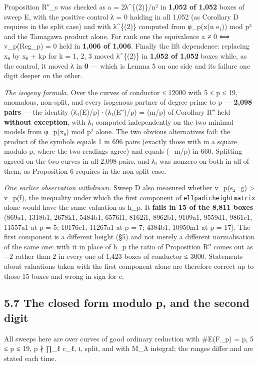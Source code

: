 \documentclass[11pt,a4paper]{article}
\theoremstyle{named}
\begin{document}
Proposition R″\_s was checked as a = 2λ\textasciicircum{}\{(2)\}/n² in \textbf{1,052 of 1,052} boxes of sweep E, with the positive control λ = 0 holding in all 1,052 (as Corollary D requires in the split case) and with λ\textasciicircum{}\{(2)\} computed from φ\_p(x(n e₁)) mod p³ and the Tamagawa product alone. For rank one the equivalence a ≠ 0 ⟺ v\_p(Reg\_p) = 0 held in \textbf{1,006 of 1,006}. Finally the lift dependence: replacing x₀ by x₀ + kp for k = 1, 2, 3 moved λ\textasciicircum{}\{(2)\} in \textbf{1,052 of 1,052} boxes while, as the control, it moved λ in \textbf{0} — which is Lemma 5 on one side and its failure one digit deeper on the other.

\textit{The isogeny formula.} Over the curves of conductor ≤ 12000 with 5 ≤ p ≤ 19, anomalous, non-split, and every isogenous partner of degree prime to p — \textbf{2,098 pairs} — the identity (λ₁(E)/p)·(λ₁(E″)/p) = (m/p) of Corollary R‴ held \textbf{without exception}, with λ₁ computed independently on the two minimal models from φ\_p(x₀) mod p² alone. The two obvious alternatives fail: the product of the symbols equals 1 in 696 pairs (exactly those with m a square modulo p, where the two readings agree) and equals (−m/p) in 660. Splitting agreed on the two curves in all 2,098 pairs, and λ₁ was nonzero on both in all of them, as Proposition 6 requires in the non-split case.

\textit{One earlier observation withdrawn.} Sweep D also measured whether v\_p(s₂·g) \textgreater{} v\_p(f), the inequality under which the first component of \texttt{ellpadicheightmatrix} alone would have the same valuation as h\_p. It \textbf{fails in 15 of the 8,811 boxes} (869a1, 1318b1, 2678k1, 5484b1, 6576f1, 8162i1, 8962b1, 9109a1, 9559d1, 9861c1, 11557a1 at p = 5; 10176c1, 11267a1 at p = 7; 4384b1, 10950m1 at p = 17). The first component is a different height (§5) and not merely a different normalisation of the same one: with it in place of h\_p the ratio of Proposition R″ comes out as −2 rather than 2 in every one of 1,423 boxes of conductor ≤ 3000. Statements about valuations taken with the first component alone are therefore correct up to those 15 boxes and wrong in sign for c.

\subsection*{5.7 The closed form modulo p, and the second digit}

All sweeps here are over curves of good ordinary reduction with \#E(F\_p) = p, 5 ≤ p ≤ 19, p ∤ ∏\_ℓ c\_ℓ, ι, split, and with M\_Λ integral; the ranges differ and are stated each time.
\end{document}
